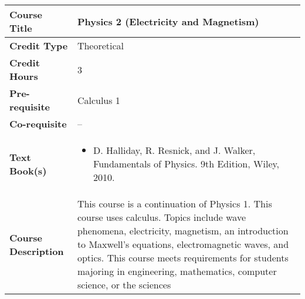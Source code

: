 \documentclass[11pt]{article}
\begin{document}
\begin{table}[h!]
\begin{tabular}{|l|l|}
\hline
\textbf{Course Title}       &  Physics 2 (Electricity and Magnetism) \\ \hline
\textbf{Credit Type}        &  Theoretical \\ \hline
\textbf{Credit Hours}       & 3 \\ \hline
\textbf{Pre-requisite}       &  Calculus 1 \\ \hline
\textbf{Co-requisite}       &  -- \\ \hline
\textbf{Text Book(s)}       & \begin{minipage}{.70\textwidth}
\begin{itemize} \itemsep-0.4em
	\vspace{3mm}
	\item D. Halliday, R. Resnick, and J. Walker, Fundamentals of Physics. 9th Edition, Wiley, 2010.
	\vspace{3mm}
\end{itemize}
\end{minipage}\\ \hline
\textbf{Course Description} & \begin{minipage}{.70\textwidth}
\vspace{3mm}
This course is a continuation of Physics 1.  This course uses calculus. Topics include wave phenomena, electricity, magnetism, an introduction to Maxwell's equations, electromagnetic waves, and optics. This course meets requirements for students majoring in engineering, mathematics, computer science, or the sciences
\vspace{3mm}
\end{minipage} \\ \hline
\end{tabular}
\end{table}
\end{document}
